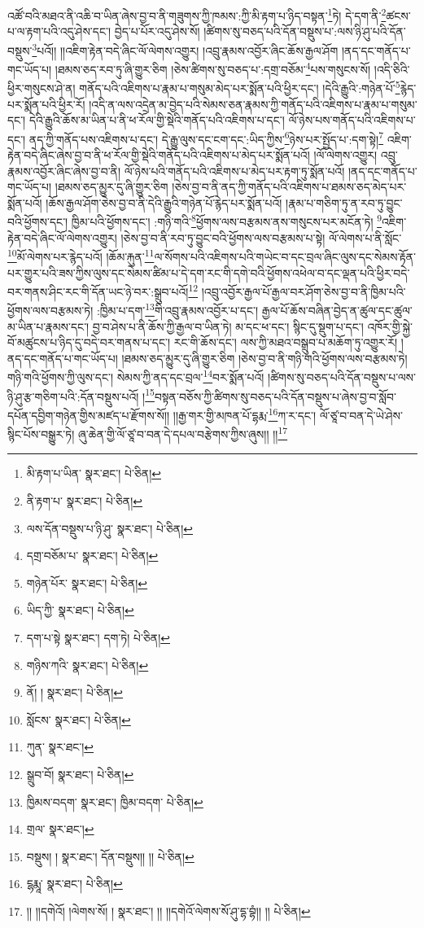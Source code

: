 འཚོ་བའི་མཐའ་ནི་འཆི་བ་ཡིན་ཞེས་བྱ་བ་ནི་གཟུགས་ཀྱི་ཁམས་:ཀྱི་མི་རྟག་པ་ཉིད་བསྟན་\footnote{མི་རྟག་པ་ཡིན་  སྣར་ཐང་།  པེ་ཅིན། }ཏེ། དེ་དག་ནི་\footnote{ནི་རྟག་པ་  སྣར་ཐང་།  པེ་ཅིན། }ཚངས་པ་ལ་རྟག་པའི་འདུ་ཤེས་དང་། བྱེད་པ་པོར་འདུ་ཤེས་སོ། །ཚིགས་སུ་བཅད་པའི་དོན་བསྡུས་པ་:ལས་ཉི་ཤུ་པའི་དོན་བསྡུས་\footnote{ལས་དོན་བསྡུས་པ་ཉི་ཤུ་  སྣར་ཐང་།  པེ་ཅིན། }པའོ།། །།འཇིག་རྟེན་བདེ་ཞིང་ལོ་ལེགས་འགྱུར། །འབྲུ་རྣམས་འབྱོར་ཞིང་ཆོས་རྒྱལ་ཤོག །ནད་དང་གནོད་པ་གང་ཡོད་པ། །ཐམས་ཅད་རབ་ཏུ་ཞི་གྱུར་ཅིག །ཅེས་ཚིགས་སུ་བཅད་པ་:དགྲ་བཅོམ་\footnote{དགྲ་བཅོམ་པ་  སྣར་ཐང་།  པེ་ཅིན། }པས་གསུངས་སོ། །འདི་ཅིའི་ཕྱིར་གསུངས་ཤེ་ན། གནོད་པའི་འཇིགས་པ་རྣམ་པ་གསུམ་མེད་པར་སྨོན་པའི་ཕྱིར་དང་། །དེའི་རྒྱུའི་:གཉེན་པོ་\footnote{གཉེན་པོར་  སྣར་ཐང་།  པེ་ཅིན། }རྙེད་པར་སྨོན་པའི་ཕྱིར་རོ། །འདི་ན་ལས་འདྲེན་མ་བྱེད་པའི་སེམས་ཅན་རྣམས་ཀྱི་གནོད་པའི་འཇིགས་པ་རྣམ་པ་གསུམ་དང་། དེའི་རྒྱུའི་ཆོས་མ་ཡིན་པ་ནི་ཕ་རོལ་གྱི་སྡེའི་གནོད་པའི་འཇིགས་པ་དང་། ལོ་ཉེས་པས་གནོད་པའི་འཇིགས་པ་དང་། ནད་ཀྱི་གནོད་པས་འཇིགས་པ་དང་། དེ་རྒྱུ་ལུས་དང་ངག་དང་:ཡིད་ཀྱིས་\footnote{ཡིད་ཀྱི་  སྣར་ཐང་།  པེ་ཅིན། }ཉེས་པར་སྤྱོད་པ་:དག་སྟེ།\footnote{དག་པ་སྟེ  སྣར་ཐང་། དག་ཏེ།  པེ་ཅིན། } འཇིག་རྟེན་བདེ་ཞིང་ཞེས་བྱ་བ་ནི་ཕ་རོལ་གྱི་སྡེའི་གནོད་པའི་འཇིགས་པ་མེད་པར་སྨོན་པའོ། །ལོ་ལེགས་འགྱུར། འབྲུ་རྣམས་འབྱོར་ཞིང་ཞེས་བྱ་བ་ནི། ལོ་ཉེས་པའི་གནོད་པའི་འཇིགས་པ་མེད་པར་རྟག་ཏུ་སྨོན་པའོ། །ནད་དང་གནོད་པ་གང་ཡོད་པ། །ཐམས་ཅད་མྱུར་དུ་ཞི་གྱུར་ཅིག །ཅེས་བྱ་བ་ནི་ནད་ཀྱི་གནོད་པའི་འཇིགས་པ་ཐམས་ཅད་མེད་པར་སྨོན་པའོ། །ཆོས་རྒྱལ་ཤོག་ཅེས་བྱ་བ་ནི་དེའི་རྒྱུའི་གཉེན་པོ་རྙེད་པར་སྨོན་པའོ། །རྣམ་པ་གཅིག་ཏུ་ན་རབ་ཏུ་བྱུང་བའི་ཕྱོགས་དང་། ཁྱིམ་པའི་ཕྱོགས་དང་། :གཉི་གའི་\footnote{གཉིས་ཀའི་  སྣར་ཐང་།  པེ་ཅིན། }ཕྱོགས་ལས་བརྩམས་ནས་གསུངས་པར་མངོན་ཏེ། \footnote{ནོ། །   སྣར་ཐང་།  པེ་ཅིན། }འཇིག་རྟེན་བདེ་ཞིང་ལོ་ལེགས་འགྱུར། །ཅེས་བྱ་བ་ནི་རབ་ཏུ་བྱུང་བའི་ཕྱོགས་ལས་བརྩམས་པ་སྟེ། ལོ་ལེགས་པ་ནི་སློང་\footnote{སློངས་  སྣར་ཐང་།  པེ་ཅིན། }མོ་ལེགས་པར་རྙེད་པའོ། །ཆོམ་རྐུན་\footnote{ཀུན་  སྣར་ཐང་། }ལ་སོགས་པའི་འཇིགས་པའི་གཡེང་བ་དང་བྲལ་ཞིང་ལུས་དང་སེམས་རྟོན་པར་གྱུར་པའི་ཟས་ཀྱིས་ལུས་དང་སེམས་ཚིམ་པ་དེ་དག་རང་གི་དགེ་བའི་ཕྱོགས་འཕེལ་བ་དང་ལྡན་པའི་ཕྱིར་བདེ་བར་གནས་ཤིང་རང་གི་དོན་ཡང་ཉེ་བར་:སྒྲུབ་པའོ།\footnote{སྒྲུབ་བོ།  སྣར་ཐང་།  པེ་ཅིན། } །འབྲུ་འབྱོར་རྒྱལ་པོ་རྒྱལ་བར་ཤོག་ཅེས་བྱ་བ་ནི་ཁྱིམ་པའི་ཕྱོགས་ལས་བརྩམས་ཏེ། :ཁྱིམ་པ་དག་\footnote{ཁྱིམས་བདག་  སྣར་ཐང་། ཁྱིམ་བདག་  པེ་ཅིན། }གི་འབྲུ་རྣམས་འབྱོར་པ་དང་། རྒྱལ་པོ་ཆོས་བཞིན་བྱེད་ན་ཚུལ་དང་ཚུལ་མ་ཡིན་པ་རྣམས་དང་། བྱ་བ་ཤེས་པ་ནི་ཆོས་ཀྱི་རྒྱལ་བ་ཡིན་ཏེ། མ་དང་ཕ་དང་། སྙིང་དུ་སྡུག་པ་དང་། འཁོར་གྱི་སྐྱེ་བོ་མཚུངས་པ་ཉིད་དུ་བདེ་བར་གནས་པ་དང་། རང་གི་ཆོས་དང་། ལས་ཀྱི་མཐའ་བསྒྲུབ་པ་མཆོག་ཏུ་འགྱུར་རོ། །ནད་དང་གནོད་པ་གང་ཡོད་པ། །ཐམས་ཅད་མྱུར་དུ་ཞི་གྱུར་ཅིག །ཅེས་བྱ་བ་ནི་གཉི་གའི་ཕྱོགས་ལས་བརྩམས་ཏེ། གཉི་གའི་ཕྱོགས་ཀྱི་ལུས་དང་། སེམས་ཀྱི་ནད་དང་བྲལ་\footnote{གྲལ་  སྣར་ཐང་། }བར་སྨོན་པའོ། །ཚིགས་སུ་བཅད་པའི་དོན་བསྡུས་པ་ལས་ཉི་ཤུ་རྩ་གཅིག་པའི་:དོན་བསྡུས་པའོ། །\footnote{བསྡུས། །  སྣར་ཐང་། དོན་བསྡུས།། །།  པེ་ཅིན། }བསྟན་བཅོས་ཀྱི་ཚིགས་སུ་བཅད་པའི་དོན་བསྡུས་པ་ཞེས་བྱ་བ་སློབ་དཔོན་དབྱིག་གཉེན་གྱིས་མཛད་པ་རྫོགས་སོ།། །།རྒྱ་གར་གྱི་མཁན་པོ་དྷརྨ་\footnote{ངྷརྨཱ་  སྣར་ཐང་།  པེ་ཅིན། }ཀ་ར་དང་། ལོ་ཙཱ་བ་བན་དེ་ཡེ་ཤེས་སྙིང་པོས་བསྒྱུར་ཏེ། ཞུ་ཆེན་གྱི་ལོ་ཙཱ་བ་བན་དེ་དཔལ་བརྩེགས་ཀྱིས་ཞུས།། །།\footnote{།། །།དགེའོ། །ལེགས་སོ། །  སྣར་ཐང་། །། །།དགེའོ་ལེགས་སོ་ཤུ་དྷ་བྷཾ།། །།  པེ་ཅིན། }